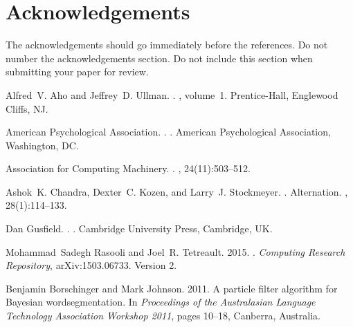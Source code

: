 \documentclass[11pt]{article}
\begin{document}
\iffalse
For papers accepted to the main conference, we will invite authors to provide a translation 
of the title and abstract and a 1-2 page synopsis of the paper in a second 
language of the authors' choice. Appropriate languages include but are not 
limited to authors' native languages, languages spoken in the authors' place 
of affiliation, and languages that are the focus of the research presented.
\fi

\section*{Acknowledgements}

The acknowledgements should go immediately before the references.  Do
not number the acknowledgements section. Do not include this section
when submitting your paper for review.

%
%

\begin{thebibliography}{}

Alfred~V. Aho and Jeffrey~D. Ullman.
.
, volume~1.
\newblock Prentice-{Hall}, Englewood Cliffs, NJ.

{American Psychological Association}.
.
.
\newblock American Psychological Association, Washington, DC.

{Association for Computing Machinery}.
.
, 24(11):503--512.

Ashok~K. Chandra, Dexter~C. Kozen, and Larry~J. Stockmeyer.
.
\newblock Alternation.
,
  28(1):114--133.

Dan Gusfield.
.
.
\newblock Cambridge University Press, Cambridge, UK.

Mohammad~Sadegh Rasooli and Joel~R. Tetreault. 2015.
.
\newblock \emph{Computing Research Repository}, arXiv:1503.06733.
\newblock Version 2.

Benjamin Borschinger and Mark Johnson. 2011.
\newblock A particle filter algorithm for {B}ayesian wordsegmentation.
\newblock In \emph{Proceedings of the Australasian Language Technology Association Workshop 2011}, pages 10--18, Canberra, Australia.



\end{thebibliography}
\end{document}
